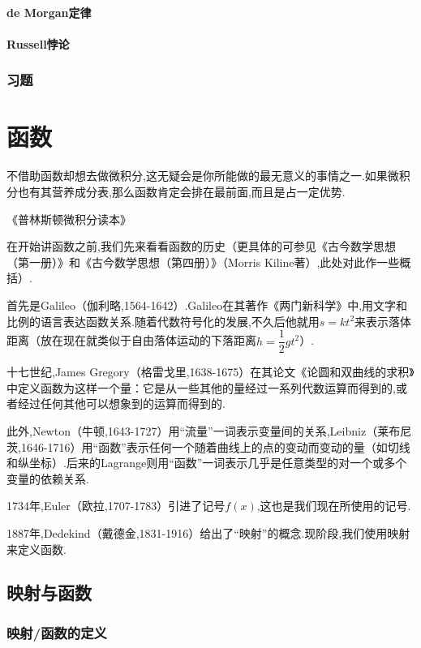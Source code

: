 \documentclass[lang=cn,math=cm,chinesefont=nofont,11pt,scheme=chinese,twocol]{elegantbook}
\begin{document}
\subsubsection{de Morgan定律}

\subsubsection{Russell悖论}

\subsection{习题}

\chapter{函数}

\epigraph{不借助函数却想去做微积分,这无疑会是你所能做的最无意义的事情之一.如果微积分也有其营养成分表,那么函数肯定会排在最前面,而且是占一定优势.}{《普林斯顿微积分读本》}

在开始讲函数之前,我们先来看看函数的历史（更具体的可参见《古今数学思想（第一册）》和《古今数学思想（第四册）》（Morris Kiline著）,此处对此作一些概括）.

首先是Galileo（伽利略,1564-1642）.Galileo在其著作《两门新科学》中,用文字和比例的语言表达函数关系.随着代数符号化的发展,不久后他就用$s=kt^2$来表示落体距离（放在现在就类似于自由落体运动的下落距离$h=\dfrac{1}{2}gt^2$）.

十七世纪,James Gregory（格雷戈里,1638-1675）在其论文《论圆和双曲线的求积》中定义函数为这样一个量：它是从一些其他的量经过一系列代数运算而得到的,或者经过任何其他可以想象到的运算而得到的.

此外,Newton（牛顿,1643-1727）用“流量”一词表示变量间的关系,Leibniz（莱布尼茨,1646-1716）用“函数”表示任何一个随着曲线上的点的变动而变动的量（如切线和纵坐标）.后来的Lagrange则用“函数”一词表示几乎是任意类型的对一个或多个变量的依赖关系.

1734年,Euler（欧拉,1707-1783）引进了记号$f(x)$,这也是我们现在所使用的记号.

1887年,Dedekind（戴德金,1831-1916）给出了“映射”的概念.现阶段,我们使用映射来定义函数.

\section{映射与函数}

\subsection{映射/函数的定义}
\end{document}
